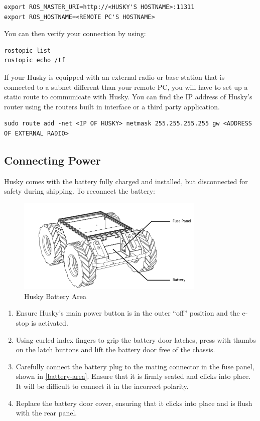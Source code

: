 \documentclass[]{clearpath-latex/clearpath-manual}
\begin{document}
\begin{lstlisting}
export ROS_MASTER_URI=http://<HUSKY'S HOSTNAME>:11311
export ROS_HOSTNAME=<REMOTE PC'S HOSTNAME>
\end{lstlisting}

You can then verify your connection by using:

\begin{lstlisting}
rostopic list
rostopic echo /tf
\end{lstlisting}

If your Husky is equipped with an external radio or base station that is connected to a subnet different than your remote PC, 
you will have to set up a static route to communicate with Husky. You can find the IP address of Husky’s 
router using the routers built in interface or a third party application.
\begin{lstlisting} 
sudo route add -net <IP OF HUSKY> netmask 255.255.255.255 gw <ADDRESS OF EXTERNAL RADIO>
\end{lstlisting}

\newpage

\subsection{Connecting Power}
Husky comes with the battery fully charged and installed, but disconnected for safety during shipping. 
To reconnect the battery:

\begin{figure}[h]
	\centering
	\includegraphics[width=0.8\textwidth]{battery-area.png}
	\caption{Husky Battery Area}
	\label{battery-area}
\end{figure}

\begin{enumerate}
	\item Ensure Husky’s main power button is in the outer “off” position and the e-stop is activated.
	\item Using curled index fingers to grip the battery door latches, press with thumbs on the latch buttons and lift the battery door free of the chassis.
	\item Carefully connect the battery plug to the mating connector in the fuse panel, shown in \autoref{battery-area}. Ensure that it is firmly seated and clicks into place. It will be difficult to connect it in the incorrect polarity.
	\item Replace the battery door cover, ensuring that it clicks into place and is flush with the rear panel.
\end{enumerate}
\end{document}
